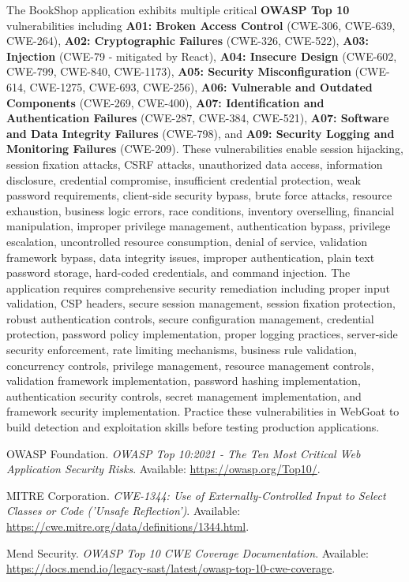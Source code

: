 \documentclass[]{UCD_CS_FYP_Report}
\begin{document}
The BookShop application exhibits multiple critical \textbf{OWASP Top 10} vulnerabilities including \textbf{A01: Broken Access Control} (CWE-306, CWE-639, CWE-264), \textbf{A02: Cryptographic Failures} (CWE-326, CWE-522), \textbf{A03: Injection} (CWE-79 - mitigated by React), \textbf{A04: Insecure Design} (CWE-602, CWE-799, CWE-840, CWE-1173), \textbf{A05: Security Misconfiguration} (CWE-614, CWE-1275, CWE-693, CWE-256), \textbf{A06: Vulnerable and Outdated Components} (CWE-269, CWE-400), \textbf{A07: Identification and Authentication Failures} (CWE-287, CWE-384, CWE-521), \textbf{A07: Software and Data Integrity Failures} (CWE-798), and \textbf{A09: Security Logging and Monitoring Failures} (CWE-209). These vulnerabilities enable session hijacking, session fixation attacks, CSRF attacks, unauthorized data access, information disclosure, credential compromise, insufficient credential protection, weak password requirements, client-side security bypass, brute force attacks, resource exhaustion, business logic errors, race conditions, inventory overselling, financial manipulation, improper privilege management, authentication bypass, privilege escalation, uncontrolled resource consumption, denial of service, validation framework bypass, data integrity issues, improper authentication, plain text password storage, hard-coded credentials, and command injection. The application requires comprehensive security remediation including proper input validation, CSP headers, secure session management, session fixation protection, robust authentication controls, secure configuration management, credential protection, password policy implementation, proper logging practices, server-side security enforcement, rate limiting mechanisms, business rule validation, concurrency controls, privilege management, resource management controls, validation framework implementation, password hashing implementation, authentication security controls, secret management implementation, and framework security implementation. Practice these vulnerabilities in WebGoat to build detection and exploitation skills before testing production applications.


\newpage
\begin{thebibliography}{99}
 OWASP Foundation. \emph{OWASP Top 10:2021 - The Ten Most Critical Web Application Security Risks}. Available: \url{https://owasp.org/Top10/}.

 MITRE Corporation. \emph{CWE-1344: Use of Externally-Controlled Input to Select Classes or Code ('Unsafe Reflection')}. Available: \url{https://cwe.mitre.org/data/definitions/1344.html}.

 Mend Security. \emph{OWASP Top 10 CWE Coverage Documentation}. Available: \url{https://docs.mend.io/legacy-sast/latest/owasp-top-10-cwe-coverage}.
\end{thebibliography}
\label{endpage}
\end{document}
